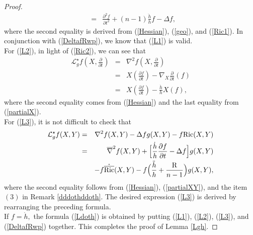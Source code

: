 \documentclass[10pt,leqno,oneside]{amsart}
\begin{document}
{\begin{proof}
\begin{eqnarray*}
            &=&\frac{\partial^2f}{\partial t^2}+(n-1)\frac{\ddot{h}}{h}f-\Delta f,
         \end{eqnarray*}
         where the second equality is derived from (\ref{Hessian}), (\ref{geo}), and (\ref{Ric1}). In conjunction with (\ref{DeltafRwp}), we know that (\ref{L1}) is valid. \\
         For (\ref{L2}), in light of (\ref{Ric2}), we can see that
         \begin{eqnarray*}
          \mathcal{L}_g^{\star}f(X,\frac{\partial}{\partial t}) &=& \nabla^2f(X,\frac{\partial}{\partial t}) \\
            &=&X(\frac{\partial f}{\partial t})-\nabla_X\frac{\partial}{\partial t}(f)\\
            &=&X(\frac{\partial f}{\partial t})-\frac{\dot{h}}{h}X(f),
         \end{eqnarray*}
         where the second equality comes from (\ref{Hessian}) and the last equality from (\ref{partialX}).\\
         For (\ref{L3}), it is not difficult to check that
         \begin{eqnarray*}
         \mathcal{L}_g^{\star}f(X,Y)&=&\nabla^2f(X,Y)-\Delta fg(X,Y)-f\text{Ric}(X,Y) \\
            &=&\overline{\nabla}^2 f(X,Y)+\Big[\frac{\dot{h}}{h}\frac{\partial f}{\partial t}-\Delta f\Big]g(X,Y)\\
            &&-f\mathring{\overline{{\rm{Ric}}}}(X,Y)-f\Big(\frac{\ddot{h}}{h}+\frac{{\rm{R}}}{n-1}\Big)g(X,Y),
         \end{eqnarray*}
         where the second equality follows from (\ref{Hessian}), (\ref{partialXY}), and the item $(3)$ in Remark \ref{dddothddoth}. The desired expression (\ref{L3}) is derived by rearranging the preceding formula.\\
         If $f=\dot{h},$ the formula (\ref{Ldoth}) is obtained by putting (\ref{L1}), (\ref{L2}), (\ref{L3}), and (\ref{DeltafRwp}) together. This completes the proof of Lemma \ref{Lgh}.
    \end{proof}

}
\end{document}
